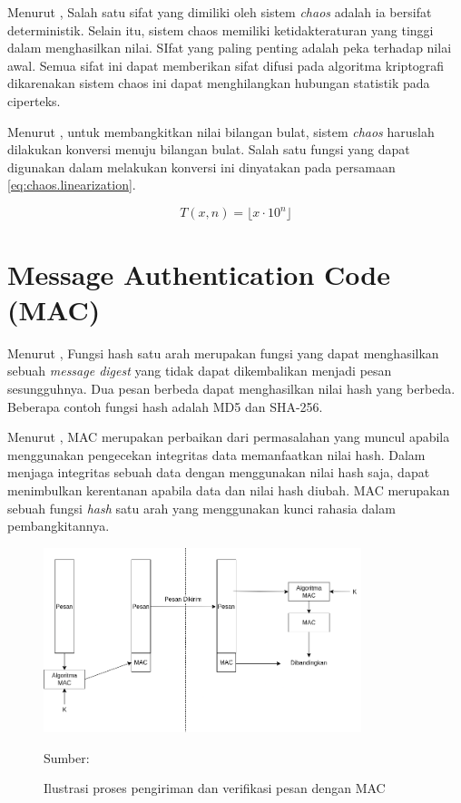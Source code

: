 Menurut \textcite{munir2019}, Salah satu sifat yang dimiliki oleh sistem \emph{chaos} adalah ia bersifat deterministik. Selain itu, sistem chaos memiliki ketidakteraturan yang tinggi dalam menghasilkan nilai. SIfat yang paling penting adalah peka terhadap nilai awal. Semua sifat ini dapat memberikan sifat difusi pada algoritma kriptografi dikarenakan sistem chaos ini dapat menghilangkan hubungan statistik pada ciperteks.

Menurut \textcite{munir2019}, untuk membangkitkan nilai bilangan bulat, sistem \emph{chaos} haruslah dilakukan konversi menuju bilangan bulat. Salah satu fungsi yang dapat digunakan dalam melakukan konversi ini dinyatakan pada persamaan \ref{eq:chaos.linearization}.

\begin{equation}
  \label{eq:chaos.linearization}
  T(x, n) = \lfloor x \cdot 10^n \rfloor
\end{equation}

\section{Message Authentication Code (MAC)}
Menurut \textcite{munir2019}, Fungsi hash satu arah merupakan fungsi yang dapat menghasilkan sebuah \emph{message digest} yang tidak dapat dikembalikan menjadi pesan sesungguhnya. Dua pesan berbeda dapat menghasilkan nilai hash yang berbeda. Beberapa contoh fungsi hash adalah MD5 dan SHA-256.

Menurut \textcite{munir2019}, MAC merupakan perbaikan dari permasalahan yang muncul apabila menggunakan pengecekan integritas data memanfaatkan nilai hash. Dalam menjaga integritas sebuah data dengan menggunakan nilai hash saja, dapat menimbulkan kerentanan apabila data dan nilai hash diubah. MAC merupakan sebuah fungsi \emph{hash} satu arah yang menggunakan kunci rahasia dalam pembangkitannya.

\begin{figure}[!h]
  \centering
  \includegraphics[width=350px]{chapters/res/chapter-2/img/mac.png}
  \caption{Ilustrasi proses pengiriman dan verifikasi pesan dengan MAC} \label{fig:mac}
  Sumber: \textcite{munir2019}
\end{figure}

